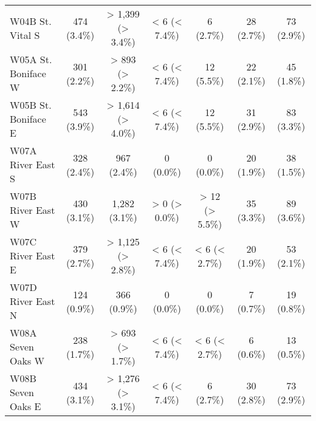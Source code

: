\documentclass{article}
\begin{document}
\begin{table}[htbp]
\begin{longtable}{l*{6}{c}}
  W04B St. Vital S                                      &           474 (3.4\%)           &        > 1,399 (> 3.4\%)        &          < 6 (< 7.4\%)          &            6 (2.7\%)            &            28 (2.7\%)           &            73 (2.9\%)           \\
  W05A St. Boniface W                                   &           301 (2.2\%)           &         > 893 (> 2.2\%)         &          < 6 (< 7.4\%)          &            12 (5.5\%)           &            22 (2.1\%)           &            45 (1.8\%)           \\
  W05B St. Boniface E                                   &           543 (3.9\%)           &        > 1,614 (> 4.0\%)        &          < 6 (< 7.4\%)          &            12 (5.5\%)           &            31 (2.9\%)           &            83 (3.3\%)           \\
  W07A River East S                                     &           328 (2.4\%)           &           967 (2.4\%)           &            0 (0.0\%)            &            0 (0.0\%)            &            20 (1.9\%)           &            38 (1.5\%)           \\
  W07B River East W                                     &           430 (3.1\%)           &          1,282 (3.1\%)          &          > 0 (> 0.0\%)          &          > 12 (> 5.5\%)         &            35 (3.3\%)           &            89 (3.6\%)           \\
  W07C River East E                                     &           379 (2.7\%)           &        > 1,125 (> 2.8\%)        &          < 6 (< 7.4\%)          &          < 6 (< 2.7\%)          &            20 (1.9\%)           &            53 (2.1\%)           \\
  W07D River East N                                     &           124 (0.9\%)           &           366 (0.9\%)           &            0 (0.0\%)            &            0 (0.0\%)            &            7 (0.7\%)            &            19 (0.8\%)           \\
  W08A Seven Oaks W                                     &           238 (1.7\%)           &         > 693 (> 1.7\%)         &          < 6 (< 7.4\%)          &          < 6 (< 2.7\%)          &            6 (0.6\%)            &            13 (0.5\%)           \\
  W08B Seven Oaks E                                     &           434 (3.1\%)           &        > 1,276 (> 3.1\%)        &          < 6 (< 7.4\%)          &            6 (2.7\%)            &            30 (2.8\%)           &            73 (2.9\%)           \\

\end{longtable}
\end{table}
\end{document}
